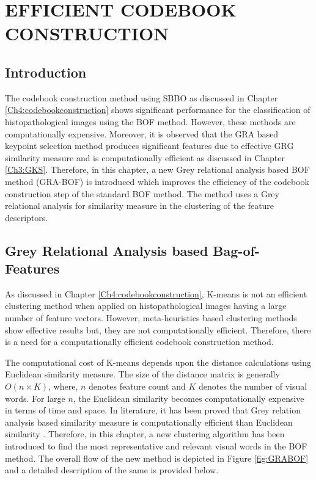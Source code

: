 

\chapter{EFFICIENT CODEBOOK CONSTRUCTION}\label{Ch5:Grey Relational Analysis Based Codebook Construction}
\graphicspath{{Chapter5/Chapter5Figs/}{Chapter5/Chapter5Figs/}}

\section{Introduction}
\label{sec:1}

The codebook construction method using SBBO as discussed in Chapter \ref{Ch4:codebookconstruction} shows significant performance for the classification of histopathological images using the BOF method. However, these methods are computationally expensive. Moreover, it is observed that the GRA based keypoint selection method produces significant features due to effective GRG similarity measure and is computationally efficient as discussed in Chapter \ref{Ch3:GKS}. Therefore, in this chapter, a new Grey relational analysis based BOF method (GRA-BOF) is introduced which improves the efficiency of the codebook construction step of the standard BOF method. The method uses a Grey relational analysis for similarity measure in the clustering of the feature descriptors.



\section {Grey Relational Analysis based Bag-of-Features}\label{ch5:sec:GRABOF}

As discussed in Chapter \ref{Ch4:codebookconstruction}, K-means is not an efficient clustering method when applied on histopathological images having a large number of feature vectors. However, meta-heuristics based clustering methods show effective results but, they are not computationally efficient. Therefore, there is a need for a computationally efficient codebook construction method. 

The computational cost of K-means depends upon the distance calculations using Euclidean similarity measure. The size of the distance matrix is generally $O(n \times K)$, where, $n$ denotes feature count and $K$ denotes the number of visual words. For large $n$, the  Euclidean similarity becomes computationally expensive in terms of time and space. In literature, it has been proved that Grey relation analysis based similarity measure is computationally efficient than  Euclidean similarity \cite{chang2005} . Therefore, in this chapter, a new clustering algorithm has been introduced to find the most representative and relevant visual words in the BOF method. The overall flow of the new method is depicted in Figure \ref{fig:GRABOF} and a detailed description of the same is provided below.

